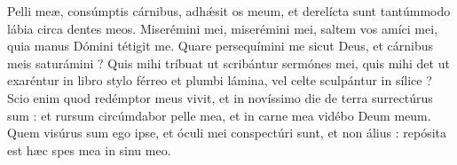 
Pelli meæ, consúmptis cárnibus, adhǽsit os meum, et derelícta sunt tantúmmodo lábia circa dentes meos.
Miserémini mei, miserémini mei, saltem vos amíci mei, quia manus Dómini tétigit me.
Quare persequímini me sicut Deus, et cárnibus meis saturámini ?
Quis mihi tríbuat ut scribántur sermónes mei, quis mihi det ut exaréntur in libro
stylo férreo et plumbi lámina, vel celte sculpántur in sílice ?
Scio enim quod redémptor meus vivit, et in novíssimo die de terra surrectúrus sum :
et rursum circúmdabor pelle mea, et in carne mea vidébo Deum meum.
Quem visúrus sum ego ipse, et óculi mei conspectúri sunt, et non álius : repósita est hæc spes mea in sinu meo.